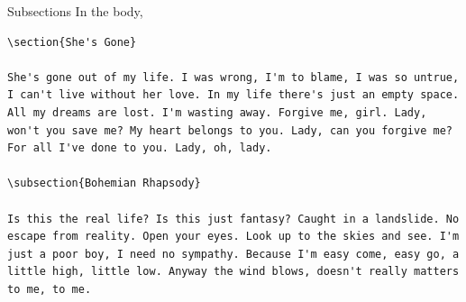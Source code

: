 \documentclass[12pt]{gshs_lecture}
\begin{document}
\begin{frame}[t,fragile]{Subsections}\small
In the body,
\begin{block}{}
\begin{lstlisting}
\section{She's Gone}

She's gone out of my life. I was wrong, I'm to blame, I was so untrue, I can't live without her love. In my life there's just an empty space. All my dreams are lost. I'm wasting away. Forgive me, girl. Lady, won't you save me? My heart belongs to you. Lady, can you forgive me? For all I've done to you. Lady, oh, lady.

\subsection{Bohemian Rhapsody}

Is this the real life? Is this just fantasy? Caught in a landslide. No escape from reality. Open your eyes. Look up to the skies and see. I'm just a poor boy, I need no sympathy. Because I'm easy come, easy go, a little high, little low. Anyway the wind blows, doesn't really matters to me, to me.
\end{lstlisting}
\end{block}
\end{frame}
\end{document}
